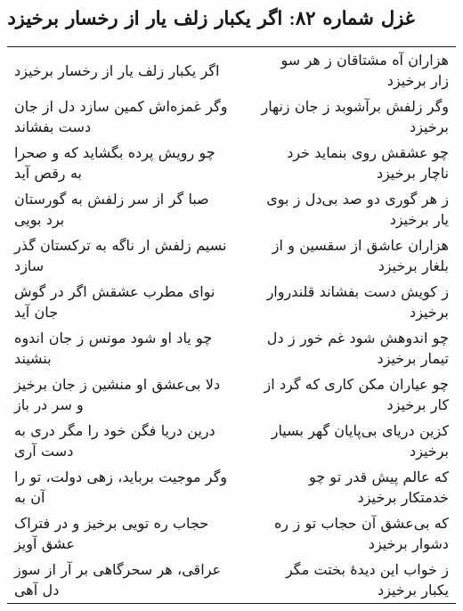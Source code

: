 \begin{center}
\section*{غزل شماره ۸۲: اگر یکبار زلف یار از رخسار برخیزد}
\label{sec:082}
\begin{longtable}{l p{0.5cm} r}
اگر یکبار زلف یار از رخسار برخیزد
&&
هزاران آه مشتاقان ز هر سو زار برخیزد
\\
وگر غمزه‌اش کمین سازد دل از جان دست بفشاند
&&
وگر زلفش برآشوبد ز جان زنهار برخیزد
\\
چو رویش پرده بگشاید که و صحرا به رقص آید
&&
چو عشقش روی بنماید خرد ناچار برخیزد
\\
صبا گر از سر زلفش به گورستان برد بویی
&&
ز هر گوری دو صد بی‌دل ز بوی یار برخیزد
\\
نسیم زلفش ار ناگه به ترکستان گذر سازد
&&
هزاران عاشق از سقسین و از بلغار برخیزد
\\
نوای مطرب عشقش اگر در گوش جان آید
&&
ز کویش دست بفشاند قلندروار برخیزد
\\
چو یاد او شود مونس ز جان اندوه بنشیند
&&
چو اندوهش شود غم خور ز دل تیمار برخیزد
\\
دلا بی‌عشق او منشین ز جان برخیز و سر در باز
&&
چو عیاران مکن کاری که گرد از کار برخیزد
\\
درین دریا فگن خود را مگر دری به دست آری
&&
کزین دریای بی‌پایان گهر بسیار برخیزد
\\
وگر موجیت برباید، زهی دولت، تو را آن به
&&
که عالم پیش قدر تو چو خدمتکار برخیزد
\\
حجاب ره تویی برخیز و در فتراک عشق آویز
&&
که بی‌عشق آن حجاب تو ز ره دشوار برخیزد
\\
عراقی، هر سحرگاهی بر آر از سوز دل آهی
&&
ز خواب این دیدهٔ بختت مگر یکبار برخیزد
\\
\end{longtable}
\end{center}
